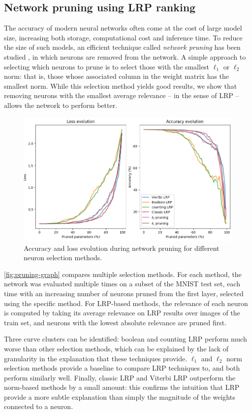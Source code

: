 \documentclass[twocolumn]{../cs-classes/cs-classes}
\newcommand*{\1}{\digitsbb{1}}
\newcommand*{\0}{\digitsbb{0}}
\begin{document}
\subsection{Network pruning using LRP ranking}
The accuracy of modern neural networks often come at the cost of large model size, increasing both storage, computational cost and inference time. To reduce the size of such models, an efficient technique called \emph{network pruning} has been studied \cite{pruning-survey,new-pruning}, in which neurons are removed from the network. A simple approach to selecting which neurons to prune is to select those with the smallest $\ell_1$ or $\ell_2$ norm: that is, those whose associated column in the weight matrix has the smallest norm. While this selection method yields good results, we show that removing neurons with the smallest average relevance -- in the sense of LRP -- allows the network to perform better.
\begin{figure}[H]
    \centering
    \includegraphics[width=\linewidth]{pruning-graph-large.png}
    \caption{Accuracy and loss evolution during network pruning for different neuron selection methods.}
    \label{fig:pruning-graph}
\end{figure}

\autoref{fig:pruning-graph} compares multiple selection methods. For each method, the network was evaluated multiple times on a subset of the MNIST test set, each time with an increasing number of neurons pruned from the first layer, selected using the specific method. For LRP-based methods, the relevance of each neuron is computed by taking its average relevance on LRP results over images of the train set, and neurons with the lowest absolute relevance are pruned first.

Three curve clusters can be identified: boolean and counting LRP perform much worse than other selection methods, which can be explained by the lack of granularity in the explanation that these techniques provide. $\ell_1$ and $\ell_2$ norm selection methods provide a baseline to compare LRP techniques to, and both perform similarly well. Finally, classic LRP and Viterbi LRP outperform the norm-based methods by a small amount: this confirms the intuition that LRP provide a more subtle explanation than simply the magnitude of the weights connected to a neuron.
\end{document}

